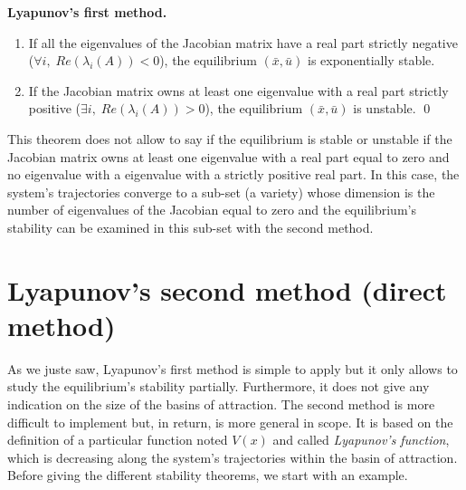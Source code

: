 \begin{theoreme}\label{premLyap}{\bf Lyapunov's first method.}

\begin{enumerate}
\item If all the eigenvalues of the Jacobian matrix have a real part strictly negative ($\forall i,\;Re(\lambda_i(A))<0$), the equilibrium $(\bar x, \bar u)$ is exponentially stable.
\item If the Jacobian matrix owns at least one eigenvalue with a real part strictly positive ($\exists i, \;Re(\lambda_i(A)) > 0$), the equilibrium $(\bar x, \bar u)$ is unstable.
\qed
\end{enumerate}
\end{theoreme}
This theorem does not allow to say if the equilibrium is stable or unstable if the Jacobian matrix owns at least one eigenvalue with a real part equal to zero and no eigenvalue with a eigenvalue with a strictly positive real part. In this case, the system's trajectories converge to a sub-set (a variety) whose dimension is the number of eigenvalues of the Jacobian equal to zero and the equilibrium's stability can be examined in this sub-set with the second method.

\section{Lyapunov's second method (direct method)}

As we juste saw, Lyapunov's first method is simple to apply but it only allows to study the equilibrium's stability partially. Furthermore, it does not give any indication on the size of the basins of attraction.  The second method is more difficult to implement but, in return, is more general in scope.  It is based on the definition of a particular function noted $V(x)$ and called {\em Lyapunov's function}, which is decreasing along the system's trajectories within the basin of attraction. Before giving the different stability theorems, we start with an example.

